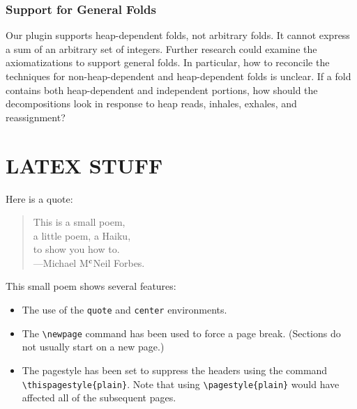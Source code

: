 \documentclass[msc,oneside]{ubcthesis}
\theoremstyle{definition}
\begin{document}
\subsection{Support for General Folds}
Our plugin supports heap-dependent folds, not arbitrary folds. It cannot express a sum of an arbitrary set of integers. Further research could examine the axiomatizations to support general folds. In particular, how to reconcile the techniques for non-heap-dependent and heap-dependent folds is unclear. If a fold contains both heap-dependent and independent portions, how should the decompositions look in response to heap reads, inhales, exhales, and reassignment? 

\chapter{LATEX STUFF}

Here is a quote:
\begin{quote}
  \begin{center}
    This is a small poem,\\
    a little poem, a Haiku,\\
    to show you how to.\\
    ---Michael M$^{\rm c}$Neil Forbes.
  \end{center}
\end{quote}

This small poem shows several features:
\begin{itemize}
\item The use of the \verb|quote| and \verb|center| environments.
\item The \verb|\newpage| command has been used to force a page
  break.  (Sections do not usually start on a new page.)
\item The pagestyle has been set to suppress the headers using the
  command \verb|\thispagestyle{plain}|.  Note that using
  \verb|\pagestyle{plain}| would have affected all of the subsequent
  pages.
\end{itemize}
\end{document}
